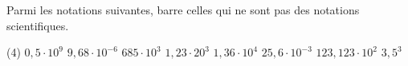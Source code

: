 %
%
Parmi les notations suivantes, barre celles qui ne sont pas des notations scientifiques.
	\begin{tasks}[label=\,] (4)
		\task $0,5\cdot 10^9$
		\task $9,68\cdot 10^{-6}$
		\task $685\cdot 10^3$
		\task $1,23\cdot 20^3$
		\task $1,36\cdot 10^4$
		\task $25,6\cdot 10^{-3}$
		\task $123,123\cdot 10^2$
		\task $3,5^3$		
	\end{tasks}
